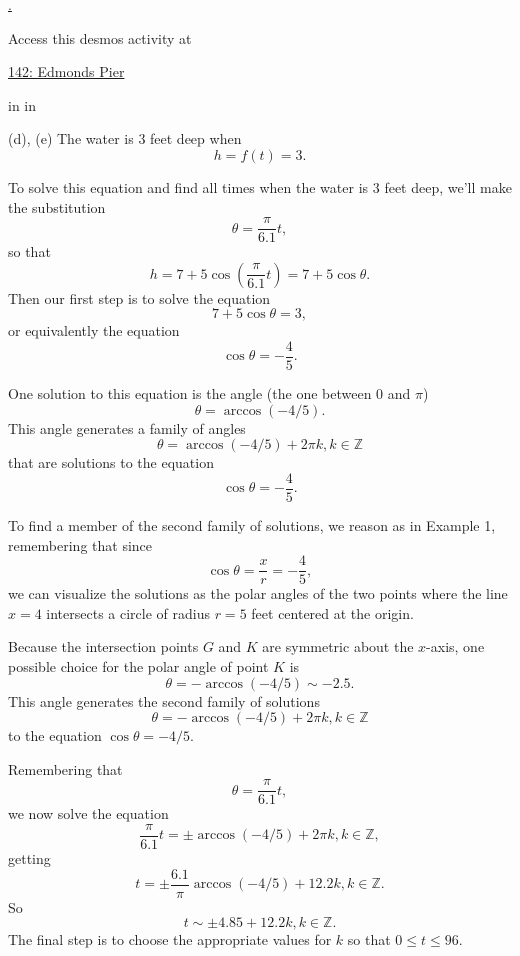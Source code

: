 \documentclass{ximera}
\newcommand{\pskip}{\vskip 0.1 in}
\begin{document}
\begin{example}
\begin{explanation}
{\href{https://www.desmos.com/calculator/3w56sayz2h}.
}
 
\begin{onlineOnly}
    \begin{center}
\end{center}
\end{onlineOnly}
  
Access this desmos activity at
 
\href{https://www.desmos.com/calculator/3w56sayz2h}{142: Edmonds Pier}


\pskip \pskip

(d), (e) The water is $3$ feet deep when
\[
   h = f(t) =3.
\]

To solve this equation and find all times when the water is $3$ feet deep, we'll make the substitution
\[
    \theta = \frac{\pi}{6.1}t ,
\]
so that
\[
     h = 7 + 5 \cos \left( \frac{\pi}{6.1}t  \right) = 7 + 5\cos\theta.
\]  
Then our first step is to solve the equation 
\[
  7 + 5\cos\theta = 3 ,
\]
or equivalently the equation
\[
   \cos \theta = -\frac{4}{5} .
\]

One solution to this equation is the angle (the one between $0$ and $\pi$)
\[
   \theta = \arccos(-4/5) .
\]
This angle generates a family of angles
\[
    \theta = \arccos(-4/5)  + 2\pi k, k\in \mathbb{Z}
\]
that are solutions to the equation 
\[
   \cos\theta = -\frac{4}{5} .
\]

To find a member of the second family of solutions, we reason as in Example 1, remembering that since
\[
\cos\theta = \frac{x}{r}   = -\frac{4}{5} ,
\] 
we can visualize the solutions as the polar angles of the two points where the line $x=4$ intersects a circle of radius $r=5$ feet centered at the origin. 

\begin{onlineOnly}
    \begin{center}
\end{center}
\end{onlineOnly}

Because the intersection points $G$ and $K$ are symmetric about the $x$-axis, one possible choice for the polar angle of point $K$ is
\[
   \theta=  - \arccos(-4/5) \sim -2.5 .
\]
This angle generates the second family of solutions
\[
  \theta = -\arccos(-4/5)  + 2\pi k, k\in \mathbb{Z}
\]
to the equation $\cos\theta = -4/5$.

Remembering that
\[
  \theta =  \frac{\pi}{6.1}t ,
\]
we now solve the equation
\[
     \frac{\pi}{6.1}t = \pm \arccos(-4/5)  + 2\pi k , k\in \mathbb{Z},
\]
getting
\[
   t = \pm \frac{6.1}{\pi} \arccos(-4/5) + 12.2 k , k\in \mathbb{Z}.
\]
So
\[
      t  \sim \pm 4.85 + 12.2 k , k\in \mathbb{Z}.
\]
The final step is to choose the appropriate values for $k$ so that $0\leq t \leq 96$.


\end{explanation}
\end{example}
\end{document}
